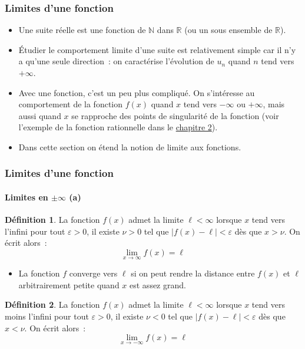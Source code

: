\documentclass[10pt,notheorems]{beamer}
\theoremstyle{plain}
\theoremstyle{definition} %
\newtheorem{definition}{Définition}
\begin{document}
\begin{frame}
  \frametitle{Limites d'une fonction}

  \begin{itemize}

  \item Une suite réelle est une fonction de $\mathbb N$ dans $\mathbb R$ (ou un sous ensemble de $\mathbb R$).\newline

  \item Étudier le comportement limite d'une suite est relativement simple car il n'y a qu'une seule direction : on caractérise l'évolution de $u_n$ quand $n$ tend vers $+\infty$.\newline

  \item Avec une fonction, c'est un peu plus compliqué. On s'intéresse au comportement de la fonction $f(x)$ quand $x$ tend vers $-\infty$ ou $+\infty$, mais aussi quand $x$ se rapproche des points de singularité de la fonction (voir l'exemple de la fonction rationnelle dans le \href{https://le-mans.adjemian.eu/calcul-économique/cours/chapitre-2.pdf}{chapitre 2}).\newline

  \item Dans cette section on étend la notion de limite aux fonctions.

  \end{itemize}
\end{frame}


\begin{frame}
  \frametitle{Limites d'une fonction}
  \framesubtitle{Limites en $\pm\infty$ (a)}


  \begin{definition}
    La fonction $f(x)$ admet la limite $\ell<\infty$ lorsque $x$ tend vers l'infini pour tout $\varepsilon>0$, il existe $\nu>0$ tel que $|f(x)-\ell|<\varepsilon$ dès que $x>\nu$. On écrit alors~:
    \[
      \lim_{x\rightarrow\infty} f(x) = \ell
    \]
  \end{definition}

  \medskip

  \begin{itemize}

  \item La fonction $f$ converge vers $\ell$ si on peut rendre la distance entre $f(x)$ et $\ell$ arbitrairement petite quand $x$ est assez grand.\newline

  \end{itemize}

  \begin{definition}
    La fonction $f(x)$ admet la limite $\ell<\infty$ lorsque $x$ tend vers moins l'infini pour tout $\varepsilon>0$, il existe $\nu<0$ tel que $|f(x)-\ell|<\varepsilon$ dès que $x<\nu$. On écrit alors~:
    \[
      \lim_{x\rightarrow -\infty} f(x) = \ell
    \]
  \end{definition}

\end{frame}
\end{document}
